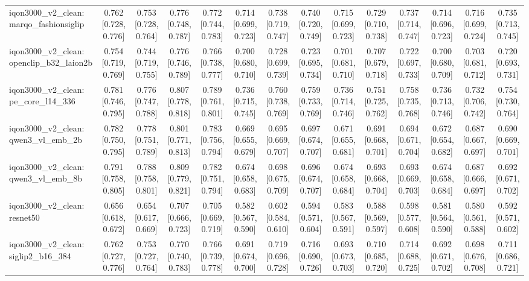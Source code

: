 \begin{table}[t]
\begin{tabular}{lccccccccccccc}
iqon3000\_v2\_clean: marqo\_fashionsiglip & 0.762 [0.728, 0.776] & 0.753 [0.728, 0.764] & 0.776 [0.748, 0.787] & 0.772 [0.744, 0.783] & 0.714 [0.699, 0.723] & 0.738 [0.719, 0.747] & 0.740 [0.720, 0.749] & 0.715 [0.699, 0.723] & 0.729 [0.710, 0.738] & 0.737 [0.714, 0.747] & 0.714 [0.696, 0.723] & 0.716 [0.699, 0.724] & 0.735 [0.713, 0.745] \\
iqon3000\_v2\_clean: openclip\_b32\_laion2b & 0.754 [0.719, 0.769] & 0.744 [0.719, 0.755] & 0.776 [0.746, 0.789] & 0.766 [0.738, 0.777] & 0.700 [0.680, 0.710] & 0.728 [0.699, 0.739] & 0.723 [0.695, 0.734] & 0.701 [0.681, 0.710] & 0.707 [0.679, 0.718] & 0.722 [0.697, 0.733] & 0.700 [0.680, 0.709] & 0.703 [0.681, 0.712] & 0.720 [0.693, 0.731] \\
iqon3000\_v2\_clean: pe\_core\_l14\_336 & 0.781 [0.746, 0.795] & 0.776 [0.747, 0.788] & 0.807 [0.778, 0.818] & 0.789 [0.761, 0.801] & 0.736 [0.715, 0.745] & 0.760 [0.738, 0.769] & 0.759 [0.733, 0.769] & 0.736 [0.714, 0.746] & 0.751 [0.725, 0.762] & 0.758 [0.735, 0.768] & 0.736 [0.713, 0.746] & 0.732 [0.706, 0.742] & 0.754 [0.730, 0.764] \\
iqon3000\_v2\_clean: qwen3\_vl\_emb\_2b & 0.782 [0.750, 0.795] & 0.778 [0.751, 0.789] & 0.801 [0.771, 0.813] & 0.783 [0.756, 0.794] & 0.669 [0.655, 0.679] & 0.695 [0.669, 0.707] & 0.697 [0.674, 0.707] & 0.671 [0.655, 0.681] & 0.691 [0.668, 0.701] & 0.694 [0.671, 0.704] & 0.672 [0.654, 0.682] & 0.687 [0.667, 0.697] & 0.690 [0.669, 0.701] \\
iqon3000\_v2\_clean: qwen3\_vl\_emb\_8b & 0.791 [0.758, 0.805] & 0.788 [0.758, 0.801] & 0.809 [0.779, 0.821] & 0.782 [0.751, 0.794] & 0.674 [0.658, 0.683] & 0.698 [0.675, 0.709] & 0.696 [0.674, 0.707] & 0.674 [0.658, 0.684] & 0.693 [0.668, 0.704] & 0.693 [0.669, 0.703] & 0.674 [0.658, 0.684] & 0.687 [0.666, 0.697] & 0.692 [0.671, 0.702] \\
iqon3000\_v2\_clean: resnet50 & 0.656 [0.618, 0.672] & 0.654 [0.617, 0.669] & 0.707 [0.666, 0.723] & 0.705 [0.669, 0.719] & 0.582 [0.567, 0.590] & 0.602 [0.584, 0.610] & 0.594 [0.571, 0.604] & 0.583 [0.567, 0.591] & 0.588 [0.569, 0.597] & 0.598 [0.577, 0.608] & 0.581 [0.564, 0.590] & 0.580 [0.561, 0.588] & 0.592 [0.571, 0.602] \\
iqon3000\_v2\_clean: siglip2\_b16\_384 & 0.762 [0.727, 0.776] & 0.753 [0.727, 0.764] & 0.770 [0.740, 0.783] & 0.766 [0.739, 0.778] & 0.691 [0.674, 0.700] & 0.719 [0.696, 0.728] & 0.716 [0.690, 0.726] & 0.693 [0.673, 0.703] & 0.710 [0.685, 0.720] & 0.714 [0.688, 0.725] & 0.692 [0.671, 0.702] & 0.698 [0.676, 0.708] & 0.711 [0.686, 0.721] \\

\end{tabular}
\end{table}
